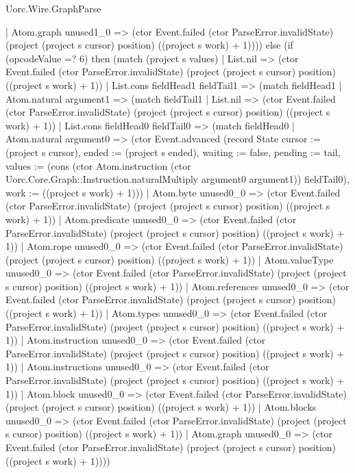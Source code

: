\begin{lexlean}{Uorc.Wire.GraphParse}
\begin{semanticmodule}
{          | Atom.graph unused1_0 => (ctor Event.failed (ctor ParseError.invalidState) (project (project s cursor) position) ((project s work) + 1)))) else (if (opcodeValue =? 6) then (match (project s values)
        | List.nil => (ctor Event.failed (ctor ParseError.invalidState) (project (project s cursor) position) ((project s work) + 1))
        | List.cons fieldHead1 fieldTail1 => (match fieldHead1
          | Atom.natural argument1 => (match fieldTail1
            | List.nil => (ctor Event.failed (ctor ParseError.invalidState) (project (project s cursor) position) ((project s work) + 1))
            | List.cons fieldHead0 fieldTail0 => (match fieldHead0
              | Atom.natural argument0 => (ctor Event.advanced (record State {cursor := (project s cursor), ended := (project s ended), waiting := false, pending := tail, values := (cons (ctor Atom.instruction (ctor Uorc.Core.Graph::Instruction.naturalMultiply argument0 argument1)) fieldTail0), work := ((project s work) + 1)}))
              | Atom.byte unused0_0 => (ctor Event.failed (ctor ParseError.invalidState) (project (project s cursor) position) ((project s work) + 1))
              | Atom.predicate unused0_0 => (ctor Event.failed (ctor ParseError.invalidState) (project (project s cursor) position) ((project s work) + 1))
              | Atom.rope unused0_0 => (ctor Event.failed (ctor ParseError.invalidState) (project (project s cursor) position) ((project s work) + 1))
              | Atom.valueType unused0_0 => (ctor Event.failed (ctor ParseError.invalidState) (project (project s cursor) position) ((project s work) + 1))
              | Atom.references unused0_0 => (ctor Event.failed (ctor ParseError.invalidState) (project (project s cursor) position) ((project s work) + 1))
              | Atom.types unused0_0 => (ctor Event.failed (ctor ParseError.invalidState) (project (project s cursor) position) ((project s work) + 1))
              | Atom.instruction unused0_0 => (ctor Event.failed (ctor ParseError.invalidState) (project (project s cursor) position) ((project s work) + 1))
              | Atom.instructions unused0_0 => (ctor Event.failed (ctor ParseError.invalidState) (project (project s cursor) position) ((project s work) + 1))
              | Atom.block unused0_0 => (ctor Event.failed (ctor ParseError.invalidState) (project (project s cursor) position) ((project s work) + 1))
              | Atom.blocks unused0_0 => (ctor Event.failed (ctor ParseError.invalidState) (project (project s cursor) position) ((project s work) + 1))
              | Atom.graph unused0_0 => (ctor Event.failed (ctor ParseError.invalidState) (project (project s cursor) position) ((project s work) + 1))))
}
\end{semanticmodule}
\end{lexlean}
